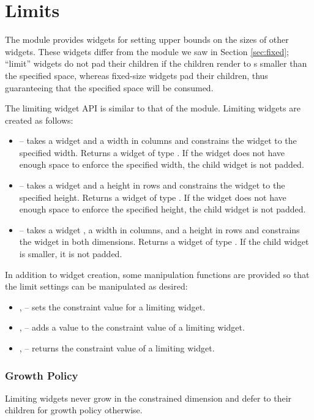 \section{Limits}
\label{sec:limits}

The  module provides widgets for setting upper bounds on
the sizes of other widgets.  These widgets differ from the 
module we saw in Section \ref{sec:fixed}; ``limit'' widgets do not pad
their children if the children render to s smaller than the
specified space, whereas fixed-size widgets pad their children, thus
guaranteeing that the specified space will be consumed.

The limiting widget API is similar to that of the  module.
Limiting widgets are created as follows:

\begin{itemize}
\item {} -- takes a widget  and a width in
  columns and constrains the widget to the specified width.  Returns a
  widget of type .  If the  widget
  does not have enough space to enforce the specified width, the child
  widget is not padded.
\item {} -- takes a widget  and a height in rows
  and constrains the widget to the specified height.  Returns a widget
  of type .  If the  widget does not
  have enough space to enforce the specified height, the child widget
  is not padded.
\item {} -- takes a widget , a width in
  columns, and a height in rows and constrains the widget in both
  dimensions.  Returns a widget of type .  If the child widget is smaller, it is not padded.
\end{itemize}

In addition to widget creation, some manipulation functions are
provided so that the limit settings can be manipulated as desired:

\begin{itemize}
\item {},  -- sets the constraint value for
  a limiting widget.
\item {},  -- adds a value to the
  constraint value of a limiting widget.
\item {},  -- returns the constraint
  value of a limiting widget.
\end{itemize}

\subsubsection{Growth Policy}

Limiting widgets never grow in the constrained dimension and defer to
their children for growth policy otherwise.

